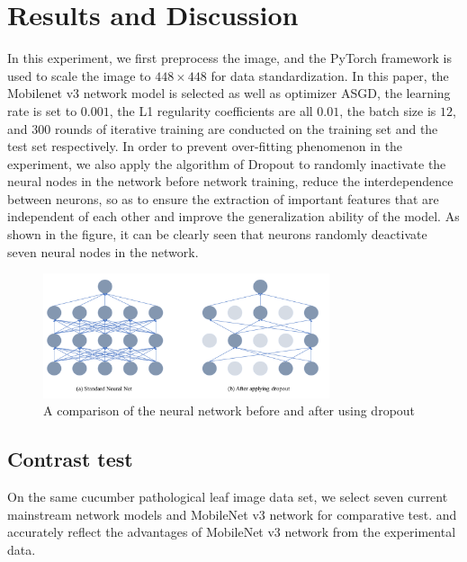 \documentclass[a4paper,fleqn]{cas-sc}
\begin{document}
\section{Results and Discussion}
In this experiment, we first preprocess the image, and the PyTorch framework is used to scale the image to $448\times448$ for data standardization. In this paper, the Mobilenet v3 network model is selected as well as optimizer ASGD, the learning rate is set to $0.001$, the L1 regularity coefficients are all $0.01$, the batch size is $12$, and $300$ rounds of iterative training are conducted on the training set and the test set respectively. In order to prevent over-fitting phenomenon in the experiment, we also apply the algorithm of Dropout to randomly inactivate the neural nodes in the network before network training, reduce the interdependence between neurons, so as to ensure the extraction of important features that are independent of each other and improve the generalization ability of the model. As shown in the figure, it can be clearly seen that neurons randomly deactivate seven neural nodes in the network.
\begin{figure}
\centering
\includegraphics[width=0.75\textwidth]{figs_rev1/f3.png}
\caption{ A comparison of the neural network before and after using dropout}
\label{fig:f3}
\end{figure}

\subsection{Contrast test}
On the same cucumber pathological leaf image data set, we select seven current mainstream network models and MobileNet v3 network for comparative test. and accurately reflect the advantages of MobileNet v3 network from the experimental data. 
\end{document}
